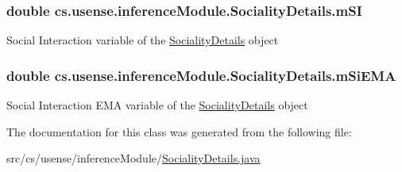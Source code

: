 \subsubsection[{m\+S\+I}]{\setlength{\rightskip}{0pt plus 5cm}double cs.\+usense.\+inference\+Module.\+Sociality\+Details.\+m\+S\+I}\label{classcs_1_1usense_1_1inference_module_1_1_sociality_details_a6fe385a5a4ec1863bc015a2e7a519289}
Social Interaction variable of the \hyperlink{classcs_1_1usense_1_1inference_module_1_1_sociality_details}{Sociality\+Details} object \hypertarget{classcs_1_1usense_1_1inference_module_1_1_sociality_details_a8752c40343750b4386076a200accfb45}{}
\subsubsection[{m\+Si\+E\+M\+A}]{\setlength{\rightskip}{0pt plus 5cm}double cs.\+usense.\+inference\+Module.\+Sociality\+Details.\+m\+Si\+E\+M\+A}\label{classcs_1_1usense_1_1inference_module_1_1_sociality_details_a8752c40343750b4386076a200accfb45}
Social Interaction E\+M\+A variable of the \hyperlink{classcs_1_1usense_1_1inference_module_1_1_sociality_details}{Sociality\+Details} object 

The documentation for this class was generated from the following file\+:\begin{DoxyCompactItemize}
\item 
src/cs/usense/inference\+Module/\hyperlink{_sociality_details_8java}{Sociality\+Details.\+java}\end{DoxyCompactItemize}
